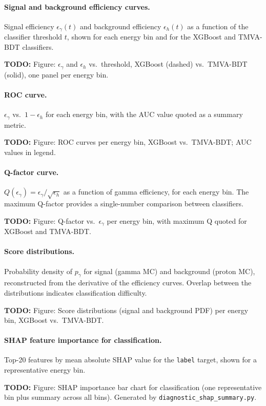 \documentclass[12pt]{article}
\newcommand{\todo}[1]{\begin{hintBox} \textbf{TODO:} #1 \end{hintBox}}
\begin{document}
\paragraph{Signal and background efficiency curves.}
Signal efficiency $\epsilon_\gamma(t)$ and background efficiency $\epsilon_h(t)$
as a function of the classifier threshold $t$,
shown for each energy bin and for the XGBoost and TMVA-BDT classifiers.
\todo{Figure: $\epsilon_\gamma$ and $\epsilon_h$ vs.\ threshold, XGBoost (dashed) vs.\ TMVA-BDT (solid), one panel per energy bin.}

\paragraph{ROC curve.}
$\epsilon_\gamma$ vs.\ $1 - \epsilon_h$ for each energy bin,
with the AUC value quoted as a summary metric.
\todo{Figure: ROC curves per energy bin, XGBoost vs.\ TMVA-BDT; AUC values in legend.}

\paragraph{Q-factor curve.}
$Q(\epsilon_\gamma) = \epsilon_\gamma / \sqrt{\epsilon_h}$ as a function of gamma efficiency,
for each energy bin.
The maximum Q-factor provides a single-number comparison between classifiers.
\todo{Figure: Q-factor vs.\ $\epsilon_\gamma$ per energy bin, with maximum Q quoted for XGBoost and TMVA-BDT.}

\paragraph{Score distributions.}
Probability density of $p_\gamma$ for signal (gamma MC) and background (proton MC),
reconstructed from the derivative of the efficiency curves.
Overlap between the distributions indicates classification difficulty.
\todo{Figure: Score distributions (signal and background PDF) per energy bin, XGBoost vs.\ TMVA-BDT.}

\paragraph{SHAP feature importance for classification.}
Top-20 features by mean absolute SHAP value for the \texttt{label} target,
shown for a representative energy bin.
\todo{Figure: SHAP importance bar chart for classification (one representative bin plus summary across all bins). Generated by \texttt{diagnostic\_shap\_summary.py}.}
\end{document}
